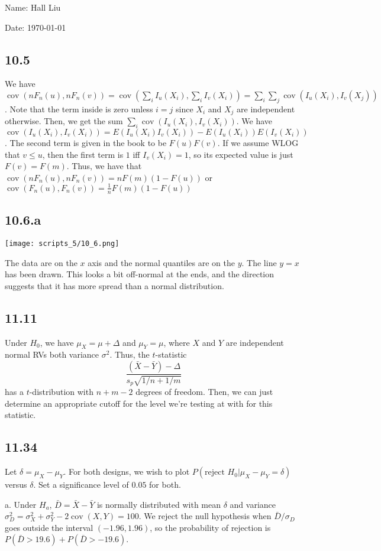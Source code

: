 \documentclass{article}
\DeclareMathOperator{\cov}{cov}
\begin{document}
Name: Hall Liu

Date: \today 
\vspace{1.5cm}

\subsection*{10.5}
We have $\cov(nF_n(u),nF_n(v))=\cov(\sum_iI_u(X_i),\sum_iI_v(X_i))=\sum_i\sum_j\cov(I_u(X_i),I_v(X_j))$. Note that the term inside is zero unless $i=j$ since $X_i$ and $X_j$ are independent otherwise. Then, we get the sum $\sum_i\cov(I_u(X_i),I_v(X_i))$. We have $\cov(I_u(X_i),I_v(X_i))=E(I_u(X_i)I_v(X_i))-E(I_u(X_i))E(I_v(X_i))$. The second term is given in the book to be $F(u)F(v)$. If we assume WLOG that $v\leq u$, then the first term is $1$ iff $I_v(X_i)=1$, so its expected value is just $F(v)=F(m)$. Thus, we have that $\cov(nF_n(u),nF_n(v))=nF(m)(1-F(u))$ or $\cov(F_n(u),F_n(v))=\frac{1}{n}F(m)(1-F(u))$
\subsection*{10.6.a}
\texttt{[image: scripts\_5/10\_6.png]}

The data are on the $x$ axis and the normal quantiles are on the $y$. The line $y=x$ has been drawn. This looks a bit off-normal at the ends, and the direction suggests that it has more spread than a normal distribution.
\subsection*{11.11}
Under $H_0$, we have $\mu_X=\mu+\Delta$ and $\mu_Y=\mu$, where $X$ and $Y$ are independent normal RVs both variance $\sigma^2$. Thus, the $t$-statistic 
$$\frac{(\bar{X}-\bar{Y})-\Delta}{s_p\sqrt{1/n+1/m}}$$
has a $t$-distribution with $n+m-2$ degrees of freedom. Then, we can just determine an appropriate cutoff for the level we're testing at with for this statistic.
\subsection*{11.34}
Let $\delta=\mu_X-\mu_Y$. For both designs, we wish to plot $P(\text{reject }H_0|\mu_X-\mu_Y=\delta)$ versus $\delta$. Set a significance level of $0.05$ for both.

\noindent a. Under $H_a$, $\bar{D}=\bar{X}-\bar{Y}$ is normally distributed with mean $\delta$ and variance $\sigma_D^2=\sigma_X^2+\sigma_Y^2-2\cov(X,Y)=100$. We reject the null hypothesis when $\bar{D}/\sigma_D$ goes outside the interval $(-1.96,1.96)$, so the probability of rejection is $P(\bar{D}>19.6)+P(\bar{D}>-19.6)$.
\end{document}
